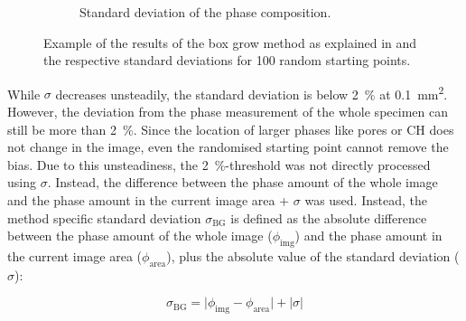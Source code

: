 \begin{figure}[H]
\begin{subfigure}[t]{0.49\linewidth}
      \caption{Standard deviation of the phase composition.}
      \label{fig:lit_box_growth_b}
    \end{subfigure}
    \caption{
        Example of the results of the box grow method as explained in \cite{bosl.1998,kameda.2006} and the respective standard deviations for \num{100} random starting points.
    }
    \label{fig:lit_box_growth}
\end{figure}

While $\sigma$ decreases unsteadily, the standard deviation is below \qty{2}{\percent} at \qty{0.1}{\square\milli\meter}.
However, the deviation from the phase measurement of the whole specimen can still be more than \qty{2}{\percent}.
Since the location of larger phases like pores or \ac{CH} does not change in the image, even the randomised starting point cannot remove the bias.
Due to this unsteadiness, the \qty{2}{\percent}-threshold was not directly processed using $\sigma$.
Instead, the difference between the phase amount of the whole image and the phase amount in the current image area + $\sigma$ was used.
Instead, the method specific standard deviation $\sigma_{\text{BG}}$ is defined as the absolute difference between the phase amount of the whole image ($\phi_{\text{img}}$) and the phase amount in the current image area ($\phi_{\text{area}}$), plus the absolute value of the standard deviation ($\sigma$):

\begin{equation}
    \sigma_{\text{BG}} = \lvert\phi_{\text{img}} - \phi_{\text{area}} \rvert + \lvert\sigma\rvert
    \label{eq:phase_difference}
\end{equation}
 
